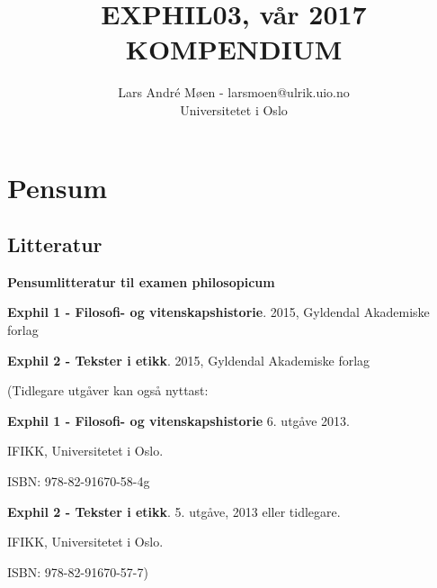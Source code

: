 \documentclass[a4paper]{IEEEtran}
\title{\bigskip EXPHIL03, vår 2017 \\[1cm] KOMPENDIUM \\[5cm]}
\author{Lars André Møen - larsmoen@ulrik.uio.no \\ Universitetet i Oslo }
\begin{document}
\maketitle
\onecolumn
\tableofcontents
\clearpage
\twocolumn
\onecolumn

\section{Pensum}
\subsection{Litteratur}
    \begin{center}
        \textbf{Pensumlitteratur til examen philosopicum}\bigskip    
    \end{center}
    
    
    \textbf{Exphil 1 - Filosofi- og vitenskapshistorie}. 2015, Gyldendal Akademiske forlag\bigskip
 
    
    \textbf{Exphil 2 - Tekster i etikk}. 2015, Gyldendal Akademiske forlag\bigskip

    
    (Tidlegare utgåver kan også nyttast: \bigskip
    
    \textbf{Exphil 1 - Filosofi- og vitenskapshistorie} 6. utgåve 2013.
    
     IFIKK, Universitetet i Oslo.
     
     ISBN: 978-82-91670-58-4g\bigskip

    
    \textbf{Exphil 2 - Tekster i etikk}. 5. utgåve, 2013 eller tidlegare.
    
     IFIKK, Universitetet i Oslo.
     
     ISBN: 978-82-91670-57-7)
    
\end{document}

